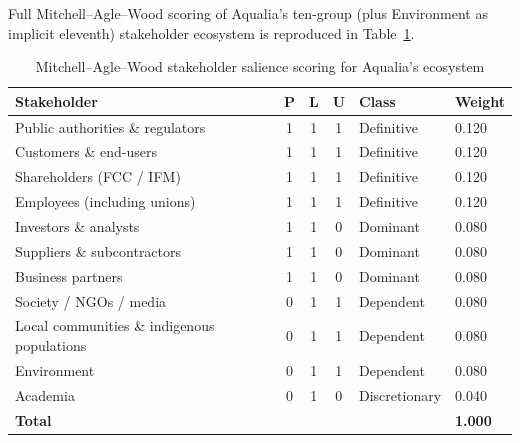 \documentclass[11pt, a4paper, twoside, openright]{scrreprt}
\begin{document}
Full Mitchell--Agle--Wood scoring of Aqualia's ten-group (plus Environment as implicit eleventh) stakeholder ecosystem is reproduced in Table~\ref{tab:salience}.

\begin{table}[h]
\caption{Mitchell--Agle--Wood stakeholder salience scoring for Aqualia's ecosystem}
\label{tab:salience}
\centering
\small
\renewcommand{\arraystretch}{1.2}
\begin{tabular}{@{}lcccll@{}}
\toprule
\textbf{Stakeholder} & \textbf{P} & \textbf{L} & \textbf{U} & \textbf{Class} & \textbf{Weight} \\
\midrule
Public authorities \& regulators & 1 & 1 & 1 & Definitive & 0.120 \\
Customers \& end-users & 1 & 1 & 1 & Definitive & 0.120 \\
Shareholders (FCC / IFM) & 1 & 1 & 1 & Definitive & 0.120 \\
Employees (including unions) & 1 & 1 & 1 & Definitive & 0.120 \\
Investors \& analysts & 1 & 1 & 0 & Dominant & 0.080 \\
Suppliers \& subcontractors & 1 & 1 & 0 & Dominant & 0.080 \\
Business partners & 1 & 1 & 0 & Dominant & 0.080 \\
Society / NGOs / media & 0 & 1 & 1 & Dependent & 0.080 \\
Local communities \& indigenous populations & 0 & 1 & 1 & Dependent & 0.080 \\
Environment & 0 & 1 & 1 & Dependent & 0.080 \\
Academia & 0 & 1 & 0 & Discretionary & 0.040 \\
\midrule
\textbf{Total} & & & & & \textbf{1.000} \\
\bottomrule
\end{tabular}
\end{table}

\cleardoublepage
{}
{}


\end{document}
